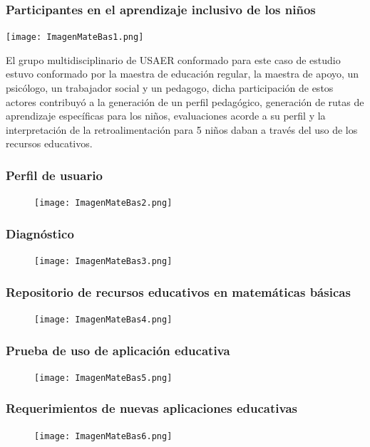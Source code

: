 \documentclass[11pt]{beamer}
\begin{document}
\begin{frame}
\frametitle{Participantes en el aprendizaje inclusivo de los niños}
    \justify
    \begin{minipage}[c]{0.4\textwidth} 
    \texttt{[image: ImagenMateBas1.png]} 
    \end{minipage}
    \begin{minipage}[c]{0.55\textwidth}
        El grupo multidisciplinario de USAER conformado para este caso de estudio estuvo conformado por la maestra de educación regular, la maestra de apoyo, un psicólogo, un trabajador social y un pedagogo, dicha participación de estos actores contribuyó a la generación de un perfil pedagógico, generación de rutas de aprendizaje específicas para los niños, evaluaciones acorde a su  perfil y la interpretación de la retroalimentación para 5 niños daban a través del uso de los recursos educativos.
    \end{minipage}
\end{frame}

\begin{frame}
\frametitle{Perfil de usuario}
    \begin{figure}
    \centering
     \texttt{[image: ImagenMateBas2.png]}
    \end{figure}
\end{frame}

\begin{frame}
\frametitle{Diagnóstico}
    \begin{figure}
    \centering
     \texttt{[image: ImagenMateBas3.png]}
    \end{figure}
\end{frame}

\begin{frame}
\frametitle{Repositorio de recursos educativos en matemáticas básicas}
    \begin{figure}
    \centering
     \texttt{[image: ImagenMateBas4.png]}
    \end{figure}
\end{frame}

\begin{frame}
\frametitle{Prueba de uso de aplicación educativa}
    \begin{figure}
    \centering
     \texttt{[image: ImagenMateBas5.png]}
    \end{figure}
\end{frame}

\begin{frame}
\frametitle{Requerimientos de nuevas aplicaciones educativas}
    \begin{figure}
    \centering
     \texttt{[image: ImagenMateBas6.png]}
    \end{figure}
\end{frame}
\end{document}
